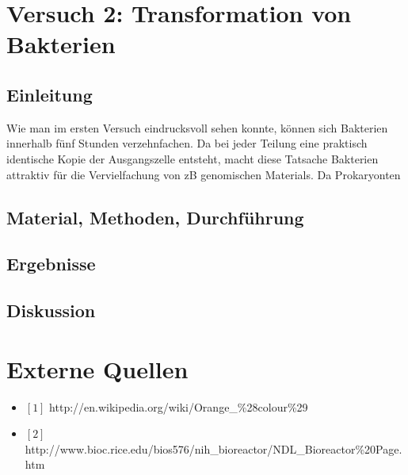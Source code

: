 \documentclass[12pt,twoside]{article}
\begin{document}
\section{Versuch 2: Transformation von Bakterien}
\subsection{Einleitung}
Wie man im ersten Versuch eindrucksvoll sehen konnte, können sich Bakterien innerhalb fünf Stunden verzehnfachen. Da bei jeder Teilung eine praktisch identische Kopie der Ausgangszelle entsteht, macht diese Tatsache Bakterien attraktiv für die Vervielfachung von zB genomischen Materials. Da Prokaryonten 
\subsection{Material, Methoden, Durchführung}
\subsection{Ergebnisse}
\subsection{Diskussion}

\section{Externe Quellen}
\begin{itemize}
\item $[1]$ http://en.wikipedia.org/wiki/Orange\_\%28colour\%29
\item $[2]$ http://www.bioc.rice.edu/bios576/nih\_bioreactor/NDL\_Bioreactor\%20Page.htm
\end{itemize}
\end{document}
